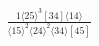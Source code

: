\documentclass[varwidth, border=5pt]{standalone}
\begin{document}
\begin{my}
$\begin{gathered}
\scriptscriptstyle\frac{1⟨25⟩^3[34]⟨14⟩}{⟨15⟩^2⟨24⟩^2⟨34⟩[45]}
\end{gathered}$
\end{my}
\end{document}
